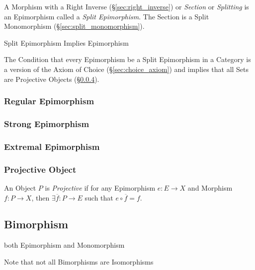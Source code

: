 A Morphism with a Right Inverse (\S\ref{sec:right_inverse}) or
\emph{Section} or \emph{Splitting} is an Epimorphism called a
\emph{Split Epimorphism}. The Section is a Split Monomorphism
(\S\ref{sec:split_monomorphism}).

Split Epimorphism Implies Epimorphism

The Condition that every Epimorphism be a Split Epimorphism in a
Category is a version of the Axiom of Choice
(\S\ref{sec:choice_axiom}) and implies that all Sets are Projective
Objects (\S\ref{sec:projective_object}).\cite{awodey06}



\subsubsection{Regular Epimorphism}\label{sec:regular_epimorphism}

\subsubsection{Strong Epimorphism}\label{sec:strong_epimorphism}

\subsubsection{Extremal Epimorphism}\label{sec:extremal_epimorphism}

\subsubsection{Projective Object}\label{sec:projective_object}

An Object $P$ is \emph{Projective} if for any Epimorphism $e : E
\rightarrow X$ and Morphism $f : P \rightarrow X$, then $\exists
\overline{f} : P \rightarrow E$ such that $e \circ \overline{f} = f$.



\subsection{Bimorphism}\label{sec:bimorphism}

both Epimorphism and Monomorphism

\fist Note that not all Bimorphisms are Isomorphisms



